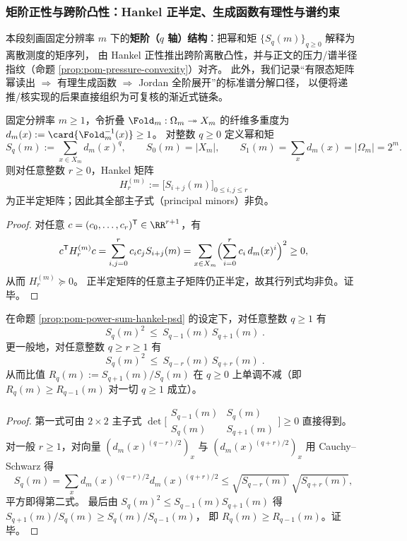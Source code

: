 \subsubsection{矩阶正性与跨阶凸性：Hankel 正半定、生成函数有理性与谱约束}\label{subsubsec:pom-moment-hankel-positivity-crossq}
本段刻画固定分辨率 \(m\) 下的\textbf{矩阶（\(q\) 轴）结构}：把幂和矩 \(\{S_q(m)\}_{q\ge 0}\) 解释为离散测度的矩序列，
由 Hankel 正性推出跨阶离散凸性，并与正文的压力/谱半径指纹（命题 \ref{prop:pom-pressure-convexity}）对齐。
此外，我们记录“有限态矩阵幂读出 \(\Rightarrow\) 有理生成函数 \(\Rightarrow\) Jordan 全阶展开”的标准谱分解口径，
以便将递推/核实现的后果直接组织为可复核的渐近式链条。

\begin{proposition}\label{prop:pom-power-sum-hankel-psd}
固定分辨率 \(m\ge 1\)，令折叠 \(\Fold_m:\Omega_m\twoheadrightarrow X_m\) 的纤维多重度为
\(
d_m(x):=\card{\Fold_m^{-1}(x)}\ge 1
\)。
对整数 \(q\ge 0\) 定义幂和矩
\[
S_q(m):=\sum_{x\in X_m} d_m(x)^q,
\qquad
S_0(m)=|X_m|,
\qquad
S_1(m)=\sum_x d_m(x)=|\Omega_m|=2^m.
\]
则对任意整数 \(r\ge 0\)，Hankel 矩阵
\[
H^{(m)}_r:=\bigl[S_{i+j}(m)\bigr]_{0\le i,j\le r}
\]
为正半定矩阵；因此其全部主子式（principal minors）非负。
\end{proposition}
\begin{proof}
对任意 \(c=(c_0,\dots,c_r)^{\mathsf T}\in\RR^{r+1}\)，有
\[
c^{\mathsf T}H^{(m)}_r c
=\sum_{i,j=0}^{r} c_ic_jS_{i+j}(m)
=\sum_{x\in X_m}\Bigl(\sum_{i=0}^{r}c_i\,d_m(x)^i\Bigr)^2
\ge 0,
\]
从而 \(H^{(m)}_r\succeq 0\)。
正半定矩阵的任意主子矩阵仍正半定，故其行列式均非负。证毕。
\end{proof}

\begin{corollary}[跨 \(q\) 的离散对数凸性链与比值单调性]\label{cor:pom-crossq-logconvex-chain}
在命题 \ref{prop:pom-power-sum-hankel-psd} 的设定下，对任意整数 \(q\ge 1\) 有
\[
\boxed{\;
S_q(m)^2\ \le\ S_{q-1}(m)\,S_{q+1}(m)\; }.
\]
更一般地，对任意整数 \(q\ge r\ge 1\) 有
\[
\boxed{\;
S_q(m)^2\ \le\ S_{q-r}(m)\,S_{q+r}(m)\; }.
\]
从而比值
\(
R_q(m):=S_{q+1}(m)/S_q(m)
\)
在 \(q\ge 0\) 上单调不减（即 \(R_{q}(m)\ge R_{q-1}(m)\) 对一切 \(q\ge 1\) 成立）。
\end{corollary}
\begin{proof}
第一式可由 \(2\times 2\) 主子式 \(\det\bigl[\begin{smallmatrix}S_{q-1}(m)&S_q(m)\\ S_q(m)&S_{q+1}(m)\end{smallmatrix}\bigr]\ge 0\) 直接得到。
对一般 \(r\ge 1\)，对向量 \((d_m(x)^{(q-r)/2})_x\) 与 \((d_m(x)^{(q+r)/2})_x\) 用 Cauchy--Schwarz 得
\[
S_q(m)=\sum_x d_m(x)^{(q-r)/2}d_m(x)^{(q+r)/2}
\le \sqrt{S_{q-r}(m)}\,\sqrt{S_{q+r}(m)},
\]
平方即得第二式。
最后由 \(S_q(m)^2\le S_{q-1}(m)S_{q+1}(m)\) 得
\(
S_{q+1}(m)/S_q(m)\ge S_q(m)/S_{q-1}(m)
\)，
即 \(R_q(m)\ge R_{q-1}(m)\)。证毕。
\end{proof}

